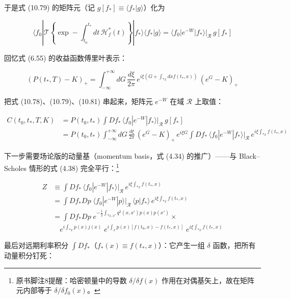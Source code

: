 于是式 (10.79) 的矩阵元（记 $g[f_*]\equiv\langle f_*|g\rangle$）化为

\begin{equation*}
\langle f_0|\mathcal{T}\left\{\exp-\int_{t_0}^{t_*}dt\,\mathcal{H}_f^*(t)\right\}|f_*\rangle\langle f_*|g\rangle
=\langle f_0|e^{-W}|f_*\rangle\Big|_{\mathcal{R}}\,g[f_*]
\tag{10.81}
\end{equation*}

回忆式 (6.55) 的收益函数傅里叶表示：

\begin{equation*}
(P(t_*,T)-K)_+=\int_{-\infty}^{+\infty}dG\,\frac{d\xi}{2\pi}\,e^{i\xi(G+\int_{*x}dxf(t_*,x))}\,(e^G-K)_+
\end{equation*}

把式 (10.78)、(10.79)、(10.81) 串起来，矩阵元 $e^{-W}$ 在域 $\mathcal{R}$ 上取值：

\begin{equation*}
\begin{aligned}
C(t_0,t_*,T,K)&=P(t_0,t_*)\int Df_*\,\langle f_0|e^{-W}|f_*\rangle\Big|_{\mathcal{R}}\,g[f_*]\\
&=P(t_0,t_*)\int_{-\infty}^{+\infty}dG\,\frac{d\xi}{2\pi}\,(e^G-K)_+\,e^{i\xi G}\int Df_*\,\langle f_0|e^{-W}|f_*\rangle\Big|_{\mathcal{R}}\,e^{i\xi\int_{*x}f(t_*,x)}
\end{aligned}
\end{equation*}

下一步需要场论版的动量基（momentum basis，式 (4.34) 的推广）——与 Black–Scholes 情形的式 (4.38) 完全平行：\footnote{原书脚注8提醒：哈密顿量中的导数 $\delta/\delta f(x)$ 作用在对偶基矢上，故在矩阵元内部等于 $\delta/\delta f_0(x)$。}

\begin{equation*}
\begin{aligned}
Z&\equiv\int Df_*\,\langle f_0|e^{-W}|f_*\rangle\Big|_{\mathcal{R}}\,e^{i\xi\int_{*x}f(t_*,x)}\\
&=\int Df_*Dp\;\langle f_0|e^{-W}|p\rangle\Big|_{\mathcal{R}}\,\langle p|f_*\rangle\,e^{i\xi\int_{*x}f(t_*,x)}\\
&=\int Df_*Dp\;e^{-\frac{1}{2}\int_{*x,x'}q^2(x,x')p(x)p(x')}\times\\
&\quad e^{i\int_{*x}p(x)j(x)}\;e^{i\int_x p(x)[f(t_0,x)-f(t_*,x)]}\;e^{i\xi\int_{*x}f(t_*,x)}
\end{aligned}
\tag{10.82}
\end{equation*}

最后对远期利率积分 $\int Df_*$（$f_*(x)\equiv f(t_*,x)$）：它产生一组 $\delta$ 函数，把所有动量积分钉死：

